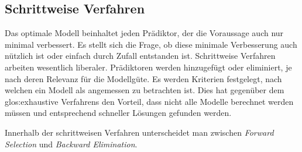 \subsection{Schrittweise Verfahren} 
Das optimale Modell beinhaltet jeden Prädiktor, der die Voraussage auch nur minimal verbessert. 
Es stellt sich die Frage, ob diese minimale Verbesserung auch nützlich ist oder einfach durch Zufall entstanden ist. 
Schrittweise Verfahren arbeiten wesentlich liberaler.  Prädiktoren werden hinzugefügt oder eliminiert, je nach deren Relevanz für die Modellgüte. 
Es werden Kriterien festgelegt, nach welchen ein Modell als angemessen zu betrachten ist. 
Dies hat gegenüber dem \glspl{glos:exhaustive Verfahren} den Vorteil, dass nicht alle Modelle berechnet werden müssen und entsprechend schneller Lösungen gefunden werden.

Innerhalb der schrittweisen Verfahren unterscheidet man zwischen \textit{Forward Selection} und \textit{Backward Elimination}. 
